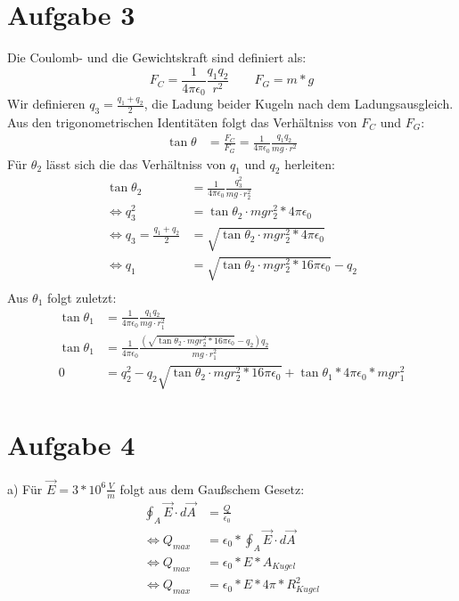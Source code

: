 \documentclass[a4paper]{article}
\newcommand{\kco}{\frac{1}{4\pi\epsilon_0}}
\begin{document}
\newpage
\setlength{\headheight}{0cm}
\section*{Aufgabe 3}
Die Coulomb- und die Gewichtskraft sind definiert als:
\[
	F_C = \kco \frac{q_1q_2}{r^2} \qquad F_G = m*g
\]
Wir definieren $q_3 = \frac{q_1 + q_2}{2} $, die Ladung  beider Kugeln nach dem Ladungsausgleich. Aus den trigonometrischen Identitäten folgt das Verhältniss von $F_C$ und $F_G$:
\begin{align*}
	\tan \theta &= \frac{F_C}{F_G} =  \kco \frac{q_1q_2}{mg \cdot r^2}
\end{align*}
Für $\theta_2$ lässt sich die das Verhältniss von $q_1$ und $q_2$ herleiten:
\begin{align*}
	\tan \theta_2 &= \kco \frac{q_3^2}{mg \cdot r_2^2} \\
	\Leftrightarrow
	q_3^2 &= \tan \theta_2 \cdot mg r_2^2 * 4\pi\epsilon_0 \\
	\Leftrightarrow
	q_3 = \frac{q_1 + q_2}{2} &= \sqrt{\tan \theta_2 \cdot mg r_2^2 * 4\pi\epsilon_0} \\
	\Leftrightarrow
	q_1 &= \sqrt{\tan \theta_2 \cdot mg r_2^2 * 16\pi\epsilon_0} - q_2 \\
\end{align*}
Aus $\theta_1$ folgt zuletzt:
\begin{align*}
	\tan \theta_1 &= \kco \frac{q_1q_2}{mg \cdot r_1^2} \\
	\tan \theta_1 &= \kco \frac{ \left( \sqrt{\tan \theta_2 \cdot mg r_2^2 * 16\pi\epsilon_0} - q_2 \right) q_2}{mg \cdot r_1^2} \\
	0 &= q_2^2 - q_2 \sqrt{\tan \theta_2 \cdot mg r_2^2 * 16\pi\epsilon_0}  + \tan \theta_1 * 4\pi\epsilon_0	*mg r_1^2 
\end{align*}


\section*{Aufgabe 4}
\par{a)}
Für $\vec E = 3 * 10^6 \frac V m$ folgt aus dem Gaußschem Gesetz:
\begin{align*}
	\oint_A \vec E \cdot d\vec{A} &= \frac Q {\epsilon_0} \\
	\Leftrightarrow
	Q_{max}	&= \epsilon_0 * \oint_A \vec E \cdot d\vec{A}\\
	\Leftrightarrow
	Q_{max}	&= \epsilon_0 * E * A_{Kugel}\\
	\Leftrightarrow
	Q_{max}	&= \epsilon_0 * E * 4\pi*R_{Kugel}^2
\end{align*}
\vspace{0.5cm}
\end{document}
